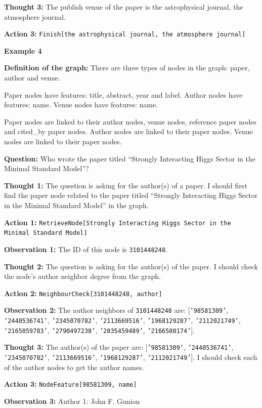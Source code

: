 \textbf{Thought 3:} The publish venue of the paper is the astrophysical journal, the atmosphere journal. \par
\textbf{Action 3:} \texttt{Finish[the astrophysical journal, the atmosphere journal]} \par

\bigskip

\textbf{Example 4} \par
\medskip

\textbf{Definition of the graph:}
There are three types of nodes in the graph: paper, author and venue. \par
Paper nodes have features: title, abstract, year and label. Author nodes have features: name. Venue nodes have features: name. \par
Paper nodes are linked to their author nodes, venue nodes, reference paper nodes and cited\_by paper nodes. Author nodes are linked to their paper nodes. Venue nodes are linked to their paper nodes. \par

\textbf{Question:}
Who wrote the paper titled ``Strongly Interacting Higgs Sector in the Minimal Standard Model''? \par

\textbf{Thought 1:} The question is asking for the author(s) of a paper. I should first find the paper node related to the paper titled ``Strongly Interacting Higgs Sector in the Minimal Standard Model'' in the graph. \par
\textbf{Action 1:} \texttt{RetrieveNode[Strongly Interacting Higgs Sector in the Minimal Standard Model]} \par
\textbf{Observation 1:} The ID of this node is \texttt{3101448248}. \par

\textbf{Thought 2:} The question is asking for the author(s) of the paper. I should check the node's author neighbor degree from the graph. \par
\textbf{Action 2:} \texttt{NeighbourCheck[3101448248, author]} \par
\textbf{Observation 2:} The author neighbors of \texttt{3101448248} are: [\texttt{'98581309'}, \texttt{'2440536741'}, \texttt{'2345070782'}, \texttt{'2113669516'}, \texttt{'1968129287'}, \texttt{'2112021749'}, \texttt{'2165059783'}, \texttt{'2790497238'}, \texttt{'2035459489'}, \texttt{'2166580174'}]. \par

\textbf{Thought 3:} The author(s) of the paper are: [\texttt{'98581309'}, \texttt{'2440536741'}, \texttt{'2345070782'}, \texttt{'2113669516'}, \texttt{'1968129287'}, \texttt{'2112021749'}]. I should check each of the author nodes to get the author names. \par
\textbf{Action 3:} \texttt{NodeFeature[98581309, name]} \par
\textbf{Observation 3:} Author 1: John F. Gunion \par

